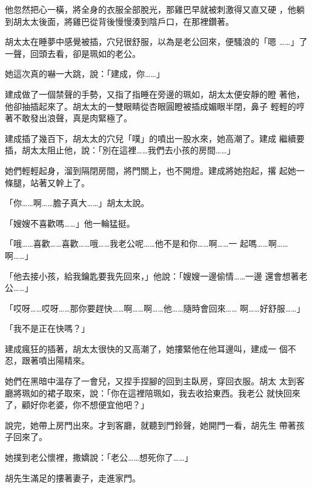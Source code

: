 他忽然把心一橫，將全身的衣服全部脫光，那雞巴早就被刺激得又直又硬
，他躺到胡太太後面，將雞巴從背後慢慢湊到陰戶口，在那裡鑽著。

胡太太在睡夢中感覺被插，穴兒很舒服，以為是老公回來，便騷浪的「嗯
……」了一聲，回頭去看，卻是珮如的老公。

她這次真的嚇一大跳，說：「建成，你……」

建成做了一個禁聲的手勢，又指了指睡在旁邊的珮如，胡太太便安靜的瞪
著他，他卻抽插起來了。胡太太的一雙眼睛從杏眼圓瞪被插成媚眼半閉，鼻子
輕輕的哼著不敢發出浪聲，真是肉緊極了。

建成插了幾百下，胡太太的穴兒「噗」的噴出一股水來，她高潮了。建成
繼續要插，胡太太阻止他，說：「別在這裡……我們去小孩的房間……」

她們輕輕起身，溜到隔閉房間，將門關上，也不開燈。建成將她抱起，撂
起她一條腿，站著又幹上了。

「你……啊……膽子真大……」胡太太說。

「嫂嫂不喜歡嗎……」他一輪猛挺。

「哦……喜歡……喜歡……哦……我老公呢……他不是和你……啊……一
起嗎……啊……啊……」

「他去接小孩，給我鑰匙要我先回來，」他說：「嫂嫂一邊偷情……一邊
還會想著老公……」

「哎呀……哎呀……那你要趕快……啊……啊……他……隨時會回來……
啊……好舒服……」

「我不是正在快嗎？」

建成瘋狂的插著，胡太太很快的又高潮了，她摟緊他在他耳邊叫，建成一
個不忍，跟著噴出陽精來。

她們在黑暗中溫存了一會兒，又捏手捏腳的回到主臥房，穿回衣服。胡太
太到客廳將珮如的裙子取來，說：「你在這裡陪珮如，我去收拾東西。我老公
就快回來了，顧好你老婆，你不想便宜他吧？」

說完，她帶上房門出來。才到客廳，就聽到門鈴聲，她開門一看，胡先生
帶著孩子回來了。

她撲到老公懷裡，撒嬌說：「老公……想死你了……」

胡先生滿足的摟著妻子，走進家門。










